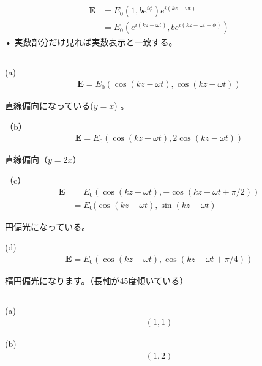 \documentclass{jsarticle}
\begin{document}
\subsection{}


\subsection{}
\begin{align}
\bm{E} &= E_0(1,be^{i\phi})e^{i(kz-\omega t)} \\
&=E_0(e^{i(kz-\omega t)},be^{i(kz-\omega t+\phi)})
\end{align}•
実数部分だけ見れば実数表示と一致する。



\subsection{}
(a)
\begin{align}
\bm{E} = E_0(\cos(kz-\omega t),\cos(kz-\omega t))
\end{align}

直線偏向になっている($y=x$)
。


（b）
\begin{align}
\bm{E} = E_0(\cos(kz-\omega t),2\cos(kz-\omega t))
\end{align}

直線偏向（$y=2x$）

（c）
\begin{align}
\bm{E}& = E_0(\cos(kz-\omega t),-\cos(kz-\omega t+\pi/2)) 　\nonumber \\
&= E_0(\cos(kz-\omega t),\sin(kz-\omega t)
\end{align}

円偏光になっている。


(d)
\begin{align}
\bm{E} = E_0(\cos(kz-\omega t),\cos(kz-\omega t+\pi/4))
\end{align}

楕円偏光になります。（長軸が45度傾いている）

\subsection{}
(a)
\begin{align}
(1, 1)
\end{align}


(b)
\begin{align}
(1, 2)
\end{align}
\end{document}
